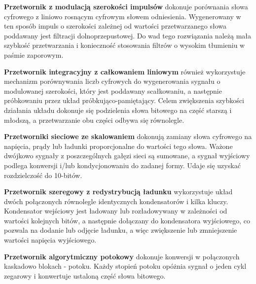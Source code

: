 \documentclass[10pt,a4paper,twoside]{report}
\theoremstyle{definition}
\theoremstyle{definition}
\theoremstyle{definition}
\theoremstyle{definition}
\theoremstyle{definition}
\begin{document}
	{	\textbf{Przetwornik z modulacją szerokości impulsów} dokonuje porównania słowa cyfrowego z liniowo rosnącym cyfrowym słowem odniesienia. Wygenerowany w ten sposób impuls o szerokości zależnej od wartości przetwarzanego słowa poddawany jest filtracji dolnoprzepustowej. Do wad tego rozwiązania należą mała szybkość przetwarzania i konieczność stosowania filtrów o wysokim tłumieniu w paśmie zaporowym. }
	
	{	\textbf{Przetwornik integracyjny z całkowaniem liniowym} również wykorzystuje mechanizm porównywania liczb cyfrowych do wygenerowania sygnału o modulowanej szerokości, który jest poddawany scałkowaniu, a następnie próbkowaniu przez układ próbkująco-pamiętający. Celem zwiększenia szybkości działania układu dokonuje się podzielenia słowa bitowego na część starszą i młodszą, a przetwarzanie obu części odbywa się równolegle. }
	
	{	\textbf{Przetworniki sieciowe ze skalowaniem} dokonują zamiany słowa cyfrowego na napięcia, prądy lub ładunki proporcjonalne do wartości tego słowa. Ważone dwójkowo sygnały z poszczególnych gałęzi sieci są sumowane, a sygnał wyjściowy podlega konwersji i/lub kondycjonowaniu do zadanej formy. Udaje się uzyskać rozdzielczość do 10-bitów.}
	
	{	\textbf{Przetwornik szeregowy z redystrybucją ładunku} wykorzystuje układ dwóch połączonych równolegle identycznych kondensatorów i kilka kluczy. Kondensator wejściowy jest ładowany lub rozładowywany w zależności od wartości kolejnych bitów, a następnie dołączany do kondensatora wyjściowego, co pozwala na dodanie lub odjęcie ładunku, a więc zwiększenie lub zmniejszenie wartości napięcia wyjściowego.
	}
	
	{	\textbf{Przetwornik algorytmiczny potokowy} dokonuje konwersji w połączonych kaskadowo blokach - potoku. Każdy stopień potoku opóżnia sygnał o jeden cykl zegarowy i konwertuje ustaloną część słowa bitowego.}
\end{document}
